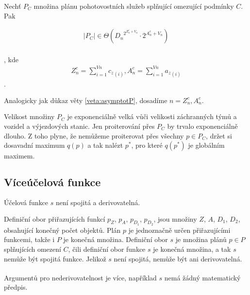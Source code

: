 \begin{veta}
  Nechť $P_C$ množina plánu pohotovostních služeb splňující omezující podmínky $C$. Pak 

  \begin{align*}
    |P_C| \in \Theta({D_n}^{2^{Z^c_n + V_n}} \cdot 2^{A^c_n + V_n})
  \end{align*}
  \\
  , kde
  \begin{align*}
    Z^c_n = \sum_{i=1}^{Vn} {c_z}_{(i)}, A^c_n = \sum_{i=1}^{Vn} {a_z}_{(i)}
  \end{align*}
  .
  \\
\end{veta}
\begin{dukaz}
  Analogicky jak důkaz věty \ref{veta:asymptotP}, dosadíme $n = Z^c_n, A^c_n$.
  \\
\end{dukaz}

Velikost množiny $P_C$ je exponenciálně velká vůči velikosti záchranných týmů a vozidel a výjezdových stanic.
Jen proiterování přes $P_C$ by trvalo exponenciálně dlouho. 
Z toho plyne, že nemůžeme proiterovat přes všechny $p \in P_C$, držet si dosavadní maximum $q(p)$ a tak nalézt $p^*$, pro které $q(p^*)$ je globálním maximem. 

\subsection{Víceúčelová funkce}

\begin{veta}\label{veta:vlastnostiSim}
  Účelová funkce $s$ není spojitá a derivovatelná.
\end{veta}

\begin{dukaz}
  Definiční obor přiřazujících funkcí $p_Z$, $p_A$, $p_{D_{1}}$, $p_{D_{2}}$, jsou množiny $Z$, $A$, $D_1$, $D_2$, obsahující konečný počet objektů.
  Plán $p$ je jednoznačně určen přiřazujícími funkcemi, takže i $P$ je konečná množina.
  Definiční obor $s$ je množina plánů $p \in P$ splňujících omezení $C$, čili definiční obor funkce $s$ je konečná množina, a tak $s$ nemůže být spojitá funkce.
  Jelikož $s$ není spojitá, nemůže být ani derivovatelná.
  \\
  \\
  Argumentů pro nederivovatelnost je více, například $s$ nemá žádný matematický předpis.
\end{dukaz}

